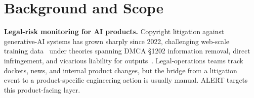 \section{Background and Scope}

\textbf{Legal-risk monitoring for AI products.} Copyright litigation against generative-AI systems has grown sharply since 2022, challenging web-scale training data~\citep{henderson2023foundation,levendowski2018copyright} under theories spanning DMCA \S1202 information removal, direct infringement, and vicarious liability for outputs~\citep{grimmelmann2015copyright}. Legal-operations teams track dockets, news, and internal product changes, but the bridge from a litigation event to a product-specific engineering action is usually manual. ALERT targets this product-facing layer.
